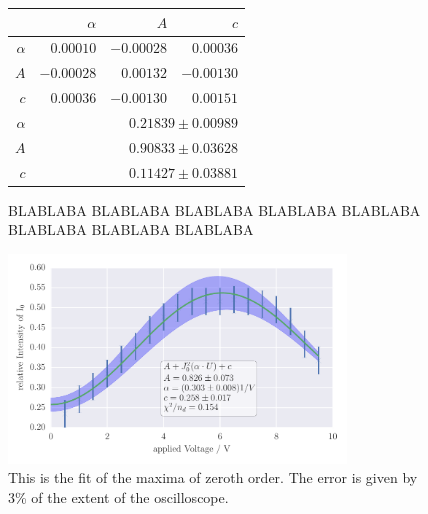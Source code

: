 \begin{figure}
\caption{
BLABLABA
BLABLABA
BLABLABA
BLABLABA
BLABLABA
BLABLABA
BLABLABA
BLABLABA
}
 \begin{tabular}{|r|r|r|r|}
 \hline 
\cellcolor{tabcolor}&\cellcolor{tabcolor}$\alpha$&\cellcolor{tabcolor}$A$&\cellcolor{tabcolor}$c$\\ \hline 
 \cellcolor{tabcolor}$\alpha$&$0.00010$ &$-0.00028$ &$0.00036$ \\ 
\cellcolor{tabcolor}$A$&$-0.00028$ &$0.00132$ &$-0.00130$ \\ 
\cellcolor{tabcolor}$c$&$0.00036$ &$-0.00130$ &$0.00151$ \\ \hline \hline
\cellcolor{tabcolor}$\alpha$&\multicolumn{3}{r|}{$0.21839 \pm 0.00989$ }\\ 
\cellcolor{tabcolor}$A$&\multicolumn{3}{r|}{$0.90833 \pm 0.03628$ }\\ 
\cellcolor{tabcolor}$c$&\multicolumn{3}{r|}{$0.11427 \pm 0.03881$ }\\ 
\hline\end{tabular}
\end{figure}

\clearpage

\begin{figure}[htpb]
    \centering
    \includegraphics[width=0.8\textwidth]{analysis/figures/besselfit_001}
    \caption{This is the fit of the maxima of zeroth order. The error is given by 3\% of the extent of the oscilloscope.}
    \label{fig:besselfit_001}
\end{figure}



